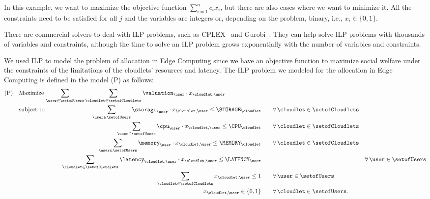 \documentclass[English]{ic-tese-v3}
\begin{document}
In this example, we want to maximize the objective function $\sum_{i=1}^{n} c_i x_i$, but there are also cases where we want to minimize it. All the constraints need to be satisfied for all $j$ and the variables are integers or, depending on the problem, binary, i.e., $x_i \in \{0,1\}$.

There are commercial solvers to deal with ILP problems, such as CPLEX~\cite{cplex2009v12} and Gurobi~\cite{gurobi}. They can help solve ILP problems with thousands of variables and constraints, although the time to solve an ILP problem grows exponentially with the number of variables and constraints.

We used ILP to model the problem of allocation in Edge Computing since we have an objective function to maximize social welfare under the constraints of the limitations of the cloudlets' resources and latency. The ILP problem we modeled for the allocation in Edge Computing is defined in the model (P) as follows:
\begin{alignat}{4}
    \mathrm{(P)}\quad & \omit\rlap{Maximize $\displaystyle \sum_{\user \in \setofUsers} \sum_{\cloudlet \in \setofCloudlets} \valuation_{\user} \cdot x_{\cloudlet, \user}$}\nonumber\\
                       & \mbox{subject to} && \quad & \sum_{\user \in \setofUsers} \storage_{\user} \cdot x_{\cloudlet, \user} \leq \STORAGE_{\cloudlet}      &\qquad \forall\, \cloudlet \in \setofCloudlets \label{lp:1}\\
                       &             && \quad & \sum_{\user \in \setofUsers} \cpu_{\user} \cdot x_{\cloudlet, \user} \leq \CPU_{\cloudlet}      &\qquad \forall\, \cloudlet \in \setofCloudlets \label{lp:2}\\
                       &             && \quad & \sum_{\user \in \setofUsers} \memory_{\user} \cdot x_{\cloudlet, \user} \leq \MEMORY_{\cloudlet}      &\qquad \forall\, \cloudlet \in \setofCloudlets \label{lp:3}\\
                       &                  && \quad & \sum_{\cloudlet \in \mathcal{\setofCloudlets}} \latency_{\cloudlet, \user} \cdot x_{\cloudlet, \user} \leq \LATENCY_{\user}      &\quad & \forall\, \user \in \mathcal{\setofUsers} \label{lp:4}\\
                       &             && \quad & \sum_{\cloudlet \in \mathcal{\setofCloudlets}} x_{\cloudlet, \user} \leq 1      &\qquad \forall\, \user \in \mathcal{\setofUsers} \label{lp:5}\\
                       &             && \quad & x_{\cloudlet,\user} \in \{0,1\}      &\qquad \forall\, \cloudlet \in \setofUsers. \label{lp:6}
    \end{alignat}
\end{document}
